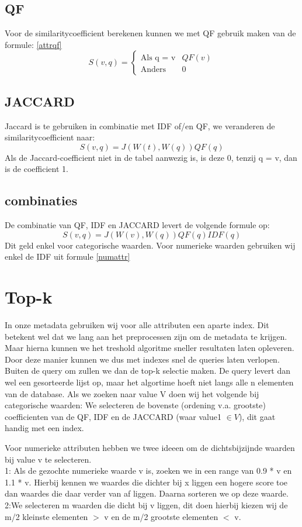 \documentclass[a4paper]{article}
\begin{document}
\subsection{QF}
Voor de similaritycoefficient berekenen kunnen we met QF gebruik maken van de formule: \eqref{attrqf}
\begin{equation}
S(v,q) = \left\{ \begin{matrix}\mbox{Als q = v}  & QF(v) \\ \mbox{Anders } & 0 \end{matrix}\right.
\label{attrqf}
\end{equation}
\subsection{JACCARD}
Jaccard is te gebruiken in combinatie met IDF of/en QF, we veranderen de similaritycoefficient naar: 
\begin{equation}
S(v,q) = J(W(t), W(q)) QF(q)
\label{catattr}
\end{equation}
Als de Jaccard-coefficient niet in de tabel aanwezig is, is deze 0, tenzij q = v, dan is de coefficient 1.
\subsection{combinaties}
De combinatie van QF, IDF en JACCARD levert de volgende formule op:
\begin{equation}
S(v,q) = J(W(v), W(q)) QF(q) IDF(q)
\label{catattr}
\end{equation}
Dit geld enkel voor categorische waarden. Voor numerieke waarden gebruiken wij enkel de IDF uit formule \eqref{numattr}
\section{Top-k}
In onze metadata gebruiken wij voor alle attributen een aparte index. Dit betekent wel dat we lang aan het preprocessen zijn om de metadata te krijgen. Maar hierna kunnen we het treshold algoritme sneller resultaten laten opleveren. Door deze manier kunnen we dus met indexes snel de queries laten verlopen. Buiten de query om zullen we dan de top-k selectie maken. De query levert dan wel een gesorteerde lijst op, maar het algortime hoeft niet langs alle n elementen van de database. 
Als we zoeken naar value V doen wij het volgende bij categorische waarden:
We selecteren de bovenste (ordening v.a. grootste) coefficienten van de QF, IDF en de JACCARD (waar value1 $\in V$), dit gaat handig met een index.

Voor numerieke attributen hebben we twee ideeen om de dichtsbijzijnde waarden bij value v te selecteren. \\
1: \indent Als de gezochte numerieke waarde v is, zoeken we in een range van 0.9 * v en 1.1 * v. Hierbij kennen we waardes die dichter bij x liggen een hogere score toe dan waardes die daar verder van af liggen. Daarna sorteren we op deze waarde. \\
2:\indent We selecteren m waarden die dicht bij v liggen, dit doen hierbij kiezen wij de m/2 kleinste elementen $>$ v en de m/2 grootste elementen $<$ v.
\end{document}
